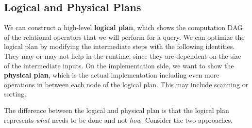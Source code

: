 \documentclass{article}
\begin{document}
  \subsection{Logical and Physical Plans}

    We can construct a high-level \textbf{logical plan}, which shows the computation DAG of the relational operators that we will perform for a query. We can optimize the logical plan by modifying the intermediate steps with the following identities. They may or may not help in the runtime, since they are dependent on the size of the intermediate inputs. On the implementation side, we want to show the \textbf{physical plan}, which is the actual implementation including even more operations in between each node of the logical plan. This may include scanning or sorting. 

    The difference between the logical and physical plan is that the logical plan represents \textit{what} needs to be done and not \textit{how}. Consider the two approaches. 
\end{document}
